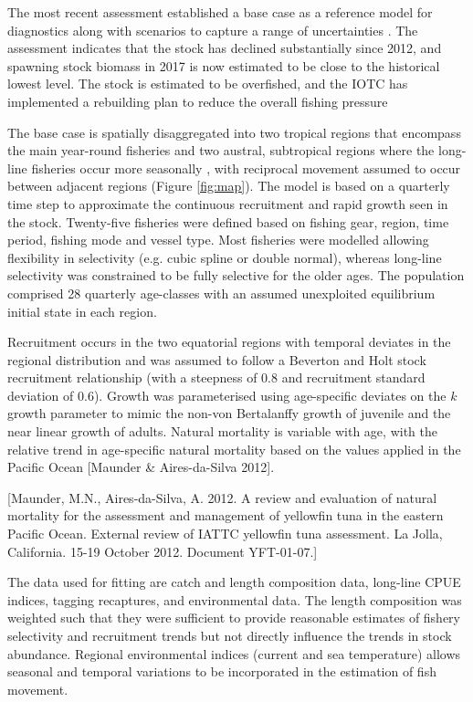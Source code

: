 The most recent assessment established a base case as a reference model for diagnostics along with scenarios to capture a range of uncertainties \parencite{fu2018yft}. The assessment indicates that the stock  has declined substantially since 2012, and spawning stock biomass in 2017 is now estimated to be close to the historical lowest level. The stock is estimated to be overfished, and the IOTC has implemented a rebuilding plan to reduce the overall fishing pressure  

The base case is spatially disaggregated into two tropical regions that encompass the main year-round fisheries and two austral, subtropical regions where the long-line fisheries occur more seasonally \parencite{langley2015yft}, with reciprocal movement assumed to occur between adjacent regions (Figure \ref{fig:map}). The model is based on a quarterly time step to approximate the continuous recruitment and rapid growth seen in the stock. Twenty-five fisheries were defined based on fishing gear, region, time period, fishing mode and vessel type. Most fisheries were modelled allowing flexibility in selectivity (e.g. cubic spline or double normal), whereas long-line selectivity was constrained to be fully selective for the older ages.  The population comprised 28 quarterly age-classes with an assumed unexploited equilibrium initial state in each region. 

Recruitment occurs in the two equatorial regions with temporal deviates in the regional distribution and was assumed to follow a Beverton and Holt stock recruitment relationship (with a steepness of 0.8 and recruitment standard deviation of 0.6).  Growth was parameterised using age-specific deviates on the $k$ growth parameter to mimic the non-von Bertalanffy growth of juvenile and the near linear growth of adults. Natural mortality is variable with age, with the relative trend in age-specific natural mortality based on the values applied in the Pacific Ocean [Maunder & Aires-da-Silva 2012]. 

[Maunder, M.N., Aires-da-Silva, A. 2012. A review and evaluation of natural mortality for the assessment and management of yellowfin tuna in the eastern Pacific Ocean. External review of IATTC yellowfin tuna assessment. La Jolla, California. 15-19 October 2012. Document YFT-01-07.]


The data used for fitting are catch and length composition data, long-line CPUE indices, tagging recaptures, and environmental data. The length composition was weighted such that they were sufficient to provide reasonable estimates of fishery selectivity and recruitment trends but not directly influence the trends in stock abundance. Regional environmental indices (current and sea temperature) allows seasonal and temporal variations to be incorporated in the estimation of fish movement. 

